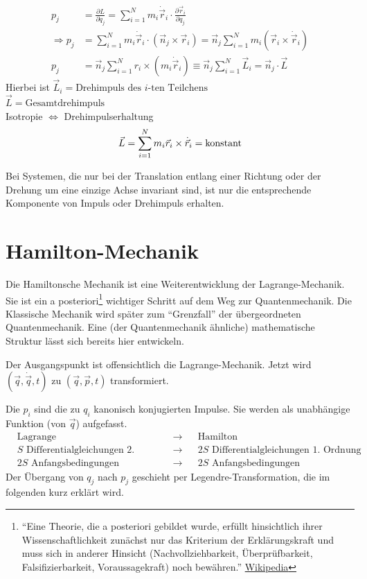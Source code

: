 \begin{align*}
	p_j &= \frac{\partial L}{\partial \dot q_j} = \sum\limits_{i=1}^Nm_i \dot {\vec r}_i \cdot \frac{\partial \vec r_i}{\partial q_j}\\
	\Rightarrow p_j &= \sum\limits_{i=1}^N m_i \dot {\vec r}_i \cdot (\vec n_j \times \vec r_i) = \vec n_j \sum\limits_{i=1}^N m_i (\vec r_i \times \dot {\vec r}_i)\\
	p_j &= \vec n_j \sum\limits_{i=1}^N r_i \times (m_i\dot{\vec r}_i) \equiv \vec n_j \sum\limits_{i=1}^N \vec L_i = \vec n_j \cdot \vec L
\end{align*}
Hierbei ist
$\vec L_i = \text{Drehimpuls des $i$-ten Teilchens}$\\
$\vec L = \text{Gesamtdrehimpuls}$\\
Isotropie  $\Leftrightarrow$ Drehimpulserhaltung
\[\vec L = \sum\limits_{i=1}^Nm_i \vec r_i \times \dot{\vec{r}}_i = \text{konstant} \]
\begin{bemerkung*}
	Bei Systemen, die nur bei der Translation entlang einer Richtung oder der Drehung um eine einzige Achse invariant sind, ist nur die entsprechende Komponente von Impuls oder Drehimpuls erhalten.
\end{bemerkung*}

\section{Hamilton-Mechanik}
Die Hamiltonsche Mechanik ist eine Weiterentwicklung der Lagrange-Mechanik. Sie ist ein a posteriori\footnote{"`Eine Theorie, die a posteriori gebildet wurde, erfüllt hinsichtlich ihrer Wissenschaftlichkeit zunächst nur das Kriterium der Erklärungskraft und muss sich in anderer Hinsicht (Nachvollziehbarkeit, Überprüfbarkeit, Falsifizierbarkeit, Voraussagekraft) noch bewähren."' \href{https://de.wikipedia.org/wiki/A_posteriori}{Wikipedia}} wichtiger Schritt auf dem Weg zur Quantenmechanik. Die Klassische Mechanik wird später zum "`Grenzfall"' der übergeordneten Quantenmechanik. Eine (der Quantenmechanik ähnliche) mathematische Struktur lässt sich bereits hier entwickeln.

Der Ausgangspunkt ist offensichtlich die Lagrange-Mechanik. Jetzt wird $(\vec q, \dot {\vec q}, t)$ zu $(\vec q, \vec p, t)$ transformiert.

Die $p_i$ sind die zu $q_i$ kanonisch konjugierten Impulse. Sie werden als unabhängige Funktion (von $\vec q$) aufgefasst.
\begin{align*}
&\text{Lagrange} &\to& &\text{Hamilton}\\
&\text{$S$ Differentialgleichungen 2. Ordnung} &\to& &\text{$2S$ Differentialgleichungen 1. Ordnung}\\
&\text{$2S$ Anfangsbedingungen} &\to& &\text{$2S$ Anfangsbedingungen}
\end{align*}
Der Übergang von $q_j$ nach $p_j$ geschieht per Legendre-Transformation, die im folgenden kurz erklärt wird.
